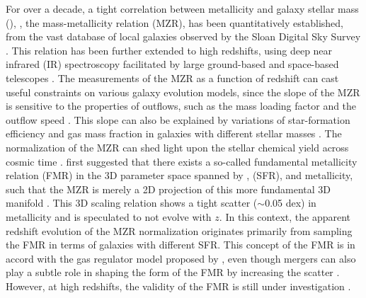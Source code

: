 For over a decade, a tight correlation between metallicity and galaxy stellar mass (\Mstar),
\ie, the mass-metallicity relation (MZR), has been quantitatively established, from the vast
database of local galaxies observed by the Sloan Digital Sky Survey
\citep{Tremonti:2004ed,Zahid:2012fp,Andrews:2013dn}. This relation has been further extended to high redshifts, using
deep near infrared (IR) spectroscopy facilitated by large ground-based and space-based
telescopes \citep{Erb:2006kn,2008A&A...488..463M,Zahid:2011bb,Henry:2013gx,2014ApJ...795..165S,Sanders:2015gk,Guo:2016wk}.
The measurements of the MZR as a function of redshift can cast useful constraints on various galaxy evolution models, since the
slope of the MZR is sensitive to the properties of outflows, such as the mass loading factor and the outflow speed \citep[see,
\eg,][]{2012MNRAS.421...98D,Lu:2015kh}.
This slope can also be explained by variations of star-formation efficiency and gas mass fraction in galaxies with different
stellar masses \citep[see, \eg,][]{Baldry:2008hm,TheUniversalRelati:2014kx}.
The normalization of the MZR can shed light upon the stellar chemical yield across cosmic time \citep{2008MNRAS.385.2181F}.
\citet{2010MNRAS.408.2115M} first suggested that there exists a so-called fundamental metallicity relation (FMR) in
the 3D parameter space spanned by \Mstar, \sfr (SFR), and metallicity, such that the MZR is merely a 2D projection of this more
fundamental 3D manifold \citep[see also][]{Hunt:2016ui}.
This 3D scaling relation shows a tight scatter ($\sim$0.05 dex) in metallicity and is speculated to not evolve with $z$.
In this context, the apparent redshift evolution of the MZR normalization originates primarily from sampling the FMR in terms of
galaxies with different SFR. This concept of the FMR is in accord with the gas regulator model proposed by \citet{Lilly:2013ko}, 
even though mergers can also play a subtle role in shaping the form of the FMR by increasing the scatter 
\citep{MichelDansac:2008gp}. However, at high redshifts, the validity of the FMR is still under investigation \citep[see, 
\eg,][]{Sanders:2015gk,Wuyts:2014ed}.

